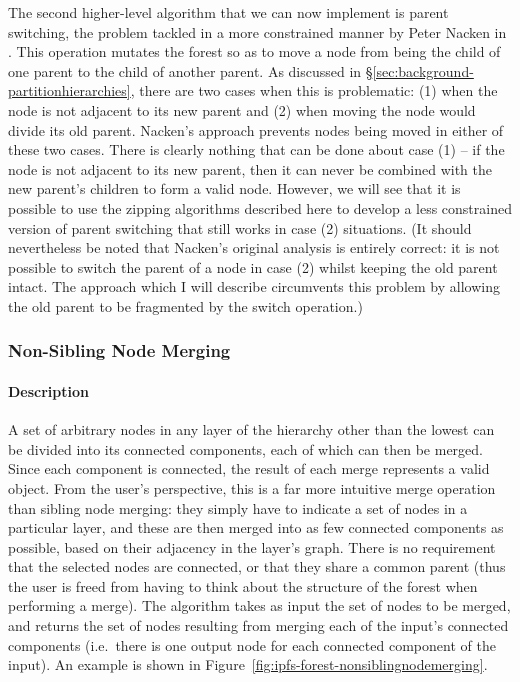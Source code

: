 The second higher-level algorithm that we can now implement is parent switching, the problem tackled in a more constrained manner by Peter Nacken in \cite{nacken95}. This operation mutates the forest so as to move a node from being the child of one parent to the child of another parent. As discussed in \S\ref{sec:background-partitionhierarchies}, there are two cases when this is problematic: (1) when the node is not adjacent to its new parent and (2) when moving the node would divide its old parent. Nacken's approach prevents nodes being moved in either of these two cases. There is clearly nothing that can be done about case (1) -- if the node is not adjacent to its new parent, then it can never be combined with the new parent's children to form a valid node. However, we will see that it is possible to use the zipping algorithms described here to develop a less constrained version of parent switching that still works in case (2) situations. (It should nevertheless be noted that Nacken's original analysis is entirely correct: it is not possible to switch the parent of a node in case (2) whilst keeping the old parent intact. The approach which I will describe circumvents this problem by allowing the old parent to be fragmented by the switch operation.)

\newpage

\subsubsection{Non-Sibling Node Merging}

\paragraph{Description}

A set of arbitrary nodes in any layer of the hierarchy other than the lowest can be divided into its connected components, each of which can then be merged. Since each component is connected, the result of each merge represents a valid object. From the user's perspective, this is a far more intuitive merge operation than sibling node merging: they simply have to indicate a set of nodes in a particular layer, and these are then merged into as few connected components as possible, based on their adjacency in the layer's graph. There is no requirement that the selected nodes are connected, or that they share a common parent (thus the user is freed from having to think about the structure of the forest when performing a merge). The algorithm takes as input the set of nodes to be merged, and returns the set of nodes resulting from merging each of the input's connected components (i.e.~there is one output node for each connected component of the input). An example is shown in Figure~\ref{fig:ipfs-forest-nonsiblingnodemerging}.


